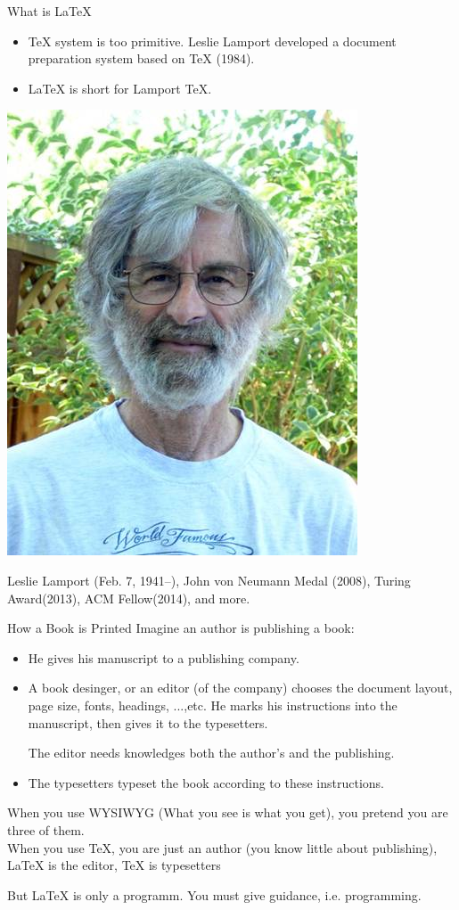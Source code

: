 \documentclass[10pt]{beamer}
\begin{document}
\begin{frame}{What is \LaTeX}
\begin{itemize}
    \item \TeX{} system is too primitive. Leslie Lamport developed a document
    preparation system based on \TeX{} (1984).

\item \LaTeX{} is short for \alert{La}mport \alert{TeX{}}.
\end{itemize}
\begin{center}
    \includegraphics[width=.4\textwidth]{Leslie-Lamport.jpg}
\end{center}
    Leslie Lamport (Feb. 7, 1941--),
    John von Neumann Medal (2008),
    Turing Award(2013), ACM Fellow(2014), and more.
\end{frame}

\begin{frame}[t]{How a Book is Printed}
Imagine an author is publishing a book:
\begin{itemize}
    \item He gives his manuscript to a publishing company.
    \item A book desinger, or an editor (of the company) chooses
        the document layout, page size, fonts, headings, ...,etc.
        He marks his instructions into the manuscript, then gives
        it to the typesetters.

        The editor needs knowledges both the author's and the publishing.
    \item The typesetters typeset the book according to these instructions.
\end{itemize}

    When you use WYSIWYG (\alert{What you see is what you get}),
    you pretend you are three of them.\\[10pt]

    When you use \TeX{}, you are just an author (you know little
    about publishing), \LaTeX{} is the editor, \TeX{} is typesetters

    But \LaTeX{} is only a programm. You must give guidance, i.e.
    programming.
\end{frame}
\end{document}

